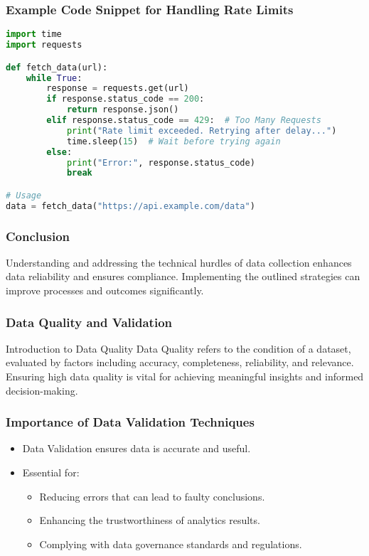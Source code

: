 \documentclass{beamer}
\begin{document}
\begin{frame}[fragile]
    \frametitle{Example Code Snippet for Handling Rate Limits}
    \begin{lstlisting}[language=Python]
import time
import requests

def fetch_data(url):
    while True:
        response = requests.get(url)
        if response.status_code == 200:
            return response.json()
        elif response.status_code == 429:  # Too Many Requests
            print("Rate limit exceeded. Retrying after delay...")
            time.sleep(15)  # Wait before trying again
        else:
            print("Error:", response.status_code)
            break

# Usage
data = fetch_data("https://api.example.com/data")
    \end{lstlisting}
\end{frame}

\begin{frame}[fragile]
    \frametitle{Conclusion}
    Understanding and addressing the technical hurdles of data collection enhances data reliability and ensures compliance. Implementing the outlined strategies can improve processes and outcomes significantly.
\end{frame}

\begin{frame}[fragile]
    \frametitle{Data Quality and Validation}
    \begin{block}{Introduction to Data Quality}
        Data Quality refers to the condition of a dataset, evaluated by factors including accuracy, completeness, reliability, and relevance.
        Ensuring high data quality is vital for achieving meaningful insights and informed decision-making.
    \end{block}
\end{frame}

\begin{frame}[fragile]
    \frametitle{Importance of Data Validation Techniques}
    \begin{itemize}
        \item Data Validation ensures data is accurate and useful.
        \item Essential for:
        \begin{itemize}
            \item Reducing errors that can lead to faulty conclusions.
            \item Enhancing the trustworthiness of analytics results.
            \item Complying with data governance standards and regulations.
        \end{itemize}
    \end{itemize}
\end{frame}
\end{document}
